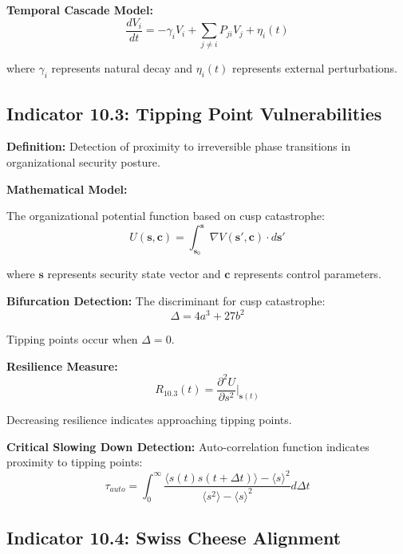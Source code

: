 \documentclass[11pt,a4paper]{article}
\begin{document}
\textbf{Temporal Cascade Model:}
\begin{equation}
\frac{dV_i}{dt} = -\gamma_i V_i + \sum_{j \neq i} P_{ji} V_j + \eta_i(t)
\end{equation}

where $\gamma_i$ represents natural decay and $\eta_i(t)$ represents external perturbations.

\subsection{Indicator 10.3: Tipping Point Vulnerabilities}

\textbf{Definition:} Detection of proximity to irreversible phase transitions in organizational security posture.

\textbf{Mathematical Model:}

The organizational potential function based on cusp catastrophe:
\begin{equation}
U(\mathbf{s}, \mathbf{c}) = \int_{\mathbf{s}_0}^{\mathbf{s}} \nabla V(\mathbf{s}', \mathbf{c}) \cdot d\mathbf{s}'
\end{equation}

where $\mathbf{s}$ represents security state vector and $\mathbf{c}$ represents control parameters.

\textbf{Bifurcation Detection:}
The discriminant for cusp catastrophe:
\begin{equation}
\Delta = 4a^3 + 27b^2
\end{equation}

Tipping points occur when $\Delta = 0$.

\textbf{Resilience Measure:}
\begin{equation}
R_{10.3}(t) = \frac{\partial^2 U}{\partial s^2}\bigg|_{\mathbf{s}(t)}
\end{equation}

Decreasing resilience indicates approaching tipping points.

\textbf{Critical Slowing Down Detection:}
Auto-correlation function indicates proximity to tipping points:
\begin{equation}
\tau_{auto} = \int_0^{\infty} \frac{\langle s(t) s(t+\Delta t) \rangle - \langle s \rangle^2}{\langle s^2 \rangle - \langle s \rangle^2} d\Delta t
\end{equation}

\subsection{Indicator 10.4: Swiss Cheese Alignment}
\end{document}
